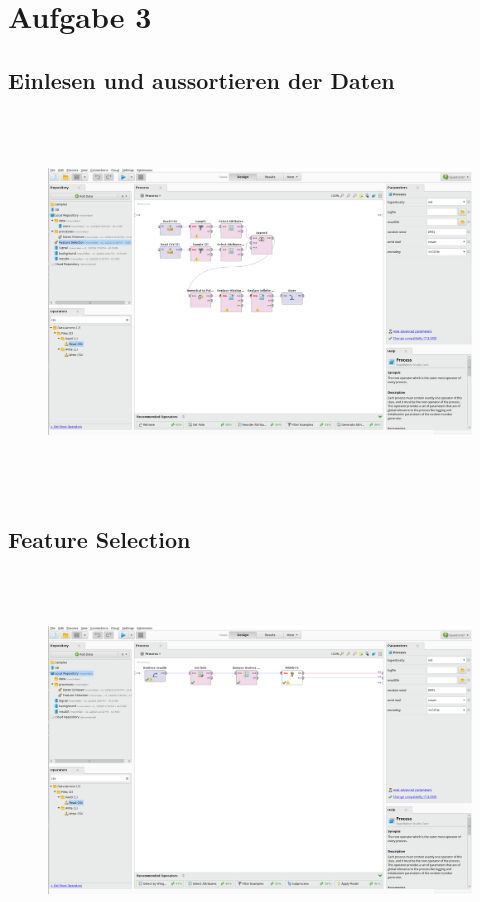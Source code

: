 \section*{Aufgabe 3}
\subsection*{Einlesen und aussortieren der Daten}
\begin{figure}[H]
  \centering
  \includegraphics[height=10cm]{./Figures/Aufgabe3a.png}
\end{figure}
\subsection*{Feature Selection}
\begin{figure}[H]
  \centering
  \includegraphics[height=10cm]{./Figures/Aufgabe3b.png}
\end{figure}
